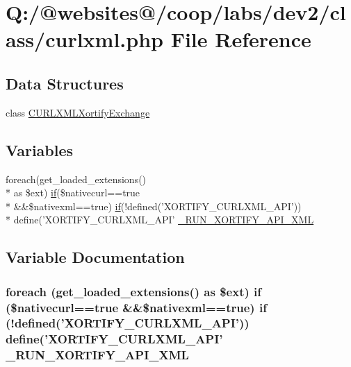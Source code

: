 \hypertarget{curlxml_8php}{\section{Q\-:/@websites@/coop/labs/dev2/class/curlxml.php File Reference}
\label{curlxml_8php}
}
\subsection*{Data Structures}
\begin{DoxyCompactItemize}
\item 
class \hyperlink{class_c_u_r_l_x_m_l_xortify_exchange}{C\-U\-R\-L\-X\-M\-L\-Xortify\-Exchange}
\end{DoxyCompactItemize}
\subsection*{Variables}
\begin{DoxyCompactItemize}
\item 
foreach(get\-\_\-loaded\-\_\-extensions() \\*
as \$ext) \hyperlink{index_8php_ae2ccdf355624402b65fc2226f2a661cd}{if}(\$nativecurl==true \\*
\&\&\$nativexml==true) \hyperlink{index_8php_ae2ccdf355624402b65fc2226f2a661cd}{if}(!defined('X\-O\-R\-T\-I\-F\-Y\-\_\-\-C\-U\-R\-L\-X\-M\-L\-\_\-\-A\-P\-I')) \\*
define('X\-O\-R\-T\-I\-F\-Y\-\_\-\-C\-U\-R\-L\-X\-M\-L\-\_\-\-A\-P\-I' \hyperlink{curlxml_8php_aca2802191aff6fc73c4f9de4ca3a35ae}{\-\_\-\-R\-U\-N\-\_\-\-X\-O\-R\-T\-I\-F\-Y\-\_\-\-A\-P\-I\-\_\-\-X\-M\-L}
\end{DoxyCompactItemize}


\subsection{Variable Documentation}
\hypertarget{curlxml_8php_aca2802191aff6fc73c4f9de4ca3a35ae}{
\subsubsection[{\-\_\-\-R\-U\-N\-\_\-\-X\-O\-R\-T\-I\-F\-Y\-\_\-\-A\-P\-I\-\_\-\-X\-M\-L}]{\setlength{\rightskip}{0pt plus 5cm}foreach (get\-\_\-loaded\-\_\-extensions() as \$ext) {\bf if} (\$nativecurl==true \&\&\$nativexml==true) {\bf if} (!defined('X\-O\-R\-T\-I\-F\-Y\-\_\-\-C\-U\-R\-L\-X\-M\-L\-\_\-\-A\-P\-I')) define('X\-O\-R\-T\-I\-F\-Y\-\_\-\-C\-U\-R\-L\-X\-M\-L\-\_\-\-A\-P\-I' \-\_\-\-R\-U\-N\-\_\-\-X\-O\-R\-T\-I\-F\-Y\-\_\-\-A\-P\-I\-\_\-\-X\-M\-L}}\label{curlxml_8php_aca2802191aff6fc73c4f9de4ca3a35ae}
